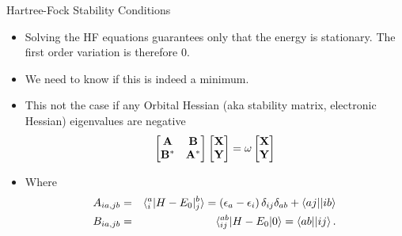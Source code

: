 \documentclass[10pt]{beamer}
\begin{document}
{{{\begin{frame}{Hartree-Fock Stability Conditions}
	\begin{itemize}[<+->]
		\item Solving the HF equations guarantees only that the energy is \alert{stationary}. The first 
		order variation is therefore 0.
		\item We need to know if this is indeed a minimum.
		\item{This not the case if any \alert{Orbital Hessian} (aka stability matrix, electronic 
		Hessian) eigenvalues are \alert{negative}
			\begin{eqnarray}
				\begin{bmatrix}
					\bf{A}   & \bf{B}   \\
					\bf{B}^* & \bf{A}^* \\
				\end{bmatrix}
				\begin{bmatrix}  \bf{X} \\ \bf{Y}  \end{bmatrix}
				= \omega \begin{bmatrix}  \bf{X} \\ \bf{Y}  \end{bmatrix}
			\end{eqnarray}
		}
		\item{Where}
		\begin{eqnarray}
			A_{ia,jb} &=& \braket{{}_i^a|H-E_0|{}_j^b} = \left(\epsilon_a - \epsilon_i \right) \delta_{ij}\delta_{ab} + \braket{aj||ib}
			\nonumber \\
			B_{ia,jb} &=& \braket{{}_{ij}^{ab}|H-E_0|0} = \braket{ab||ij}.
		\end{eqnarray}
	\end{itemize}
\end{frame}


}}}
\end{document}
